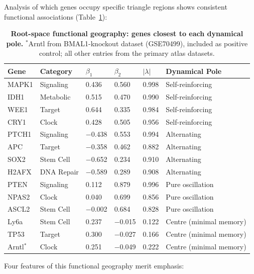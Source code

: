 \documentclass[11pt,letterpaper]{article}
\begin{document}
Analysis of which genes occupy specific triangle regions shows consistent functional associations (Table~\ref{tab:rootspace_geography}):

\begin{table}[H]
\centering
\caption{\textbf{Root-space functional geography: genes closest to each dynamical pole.} $^*$Arntl from BMAL1-knockout dataset (GSE70499), included as positive control; all other entries from the primary atlas datasets.}
\label{tab:rootspace_geography}
\begin{tabular}{p{2.5cm}p{2cm}p{1.5cm}p{1.5cm}p{1.5cm}p{3cm}}
\toprule
\textbf{Gene} & \textbf{Category} & \textbf{$\beta_1$} & \textbf{$\beta_2$} & \textbf{$|\lambda|$} & \textbf{Dynamical Pole} \\
\midrule
MAPK1 & Signaling & 0.436 & 0.560 & 0.998 & Self-reinforcing \\
IDH1 & Metabolic & 0.515 & 0.470 & 0.990 & Self-reinforcing \\
WEE1 & Target & 0.644 & 0.335 & 0.984 & Self-reinforcing \\
CRY1 & Clock & 0.428 & 0.505 & 0.956 & Self-reinforcing \\
\midrule
PTCH1 & Signaling & $-$0.438 & 0.553 & 0.994 & Alternating \\
APC & Target & $-$0.358 & 0.462 & 0.882 & Alternating \\
SOX2 & Stem Cell & $-$0.652 & 0.234 & 0.910 & Alternating \\
H2AFX & DNA Repair & $-$0.589 & 0.289 & 0.908 & Alternating \\
\midrule
PTEN & Signaling & 0.112 & 0.879 & 0.996 & Pure oscillation \\
NPAS2 & Clock & 0.040 & 0.699 & 0.856 & Pure oscillation \\
ASCL2 & Stem Cell & $-$0.002 & 0.684 & 0.828 & Pure oscillation \\
\midrule
Ly6a & Stem Cell & 0.237 & $-$0.015 & 0.122 & Centre (minimal memory) \\
TP53 & Target & 0.300 & $-$0.027 & 0.166 & Centre (minimal memory) \\
Arntl$^*$ & Clock & 0.251 & $-$0.049 & 0.222 & Centre (minimal memory) \\
\bottomrule
\end{tabular}
\end{table}

Four features of this functional geography merit emphasis:
\end{document}
